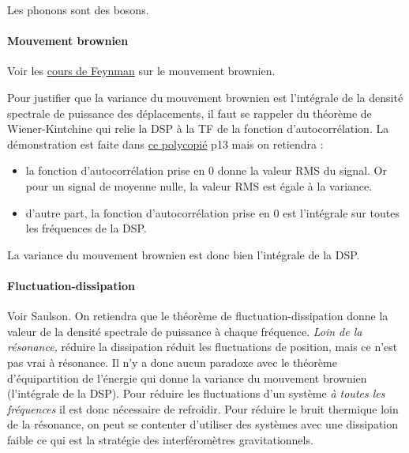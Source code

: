 \documentclass[12pt,a4paper]{article}
\begin{document}
Les phonons sont des bosons.

\paragraph{Mouvement brownien\\}
Voir les \href{https://www.feynmanlectures.caltech.edu/I_41.html}{cours de Feynman} sur le mouvement brownien.

Pour justifier que la variance du mouvement brownien est l'intégrale de la densité spectrale de puissance des déplacements, il faut se rappeler du théorème de Wiener-Kintchine qui relie la DSP à la TF de la fonction d'autocorrélation.
La démonstration est faite dans \href{https://www.google.com/url?sa=t&rct=j&q=&esrc=s&source=web&cd=&ved=2ahUKEwiH3r61hPXpAhUMkRQKHW_3DH0QFjACegQIAxAB&url=http\%3A\%2F\%2Fwww.dalembert.upmc.fr\%2Fhome\%2Follivier\%2Fimages\%2FDocumentsPeda\%2F4AA06_SigAleat_SystLin_1314.pdf&usg=AOvVaw0JdnroUtcqr9KC1VxnqGSz}{ce polycopié} p13 mais on retiendra :
\begin{itemize}
\item la fonction d'autocorrélation prise en 0 donne la valeur RMS du signal.
Or pour un signal de moyenne nulle, la valeur RMS est égale à la variance.
\item d'autre part, la fonction d'autocorrélation prise en 0 est l'intégrale sur toutes les fréquences de la DSP.
\end{itemize}
La variance du mouvement brownien est donc bien l'intégrale de la DSP.

\paragraph{Fluctuation-dissipation\\}
Voir Saulson.
On retiendra que le théorème de fluctuation-dissipation donne la valeur de la densité spectrale de puissance à chaque fréquence.
\emph{Loin de la résonance,} réduire la dissipation réduit les fluctuations de position, mais ce n'est pas vrai à résonance.
Il n'y a donc aucun paradoxe avec le théorème d'équipartition de l'énergie qui donne la variance du mouvement brownien (l'intégrale de la DSP).
Pour réduire les fluctuations d'un système \emph{à toutes les fréquences} il est donc nécessaire de refroidir.
Pour réduire le bruit thermique loin de la résonance, on peut se contenter d'utiliser des systèmes avec une dissipation faible ce qui est la stratégie des interféromètres gravitationnels.
\end{document}
